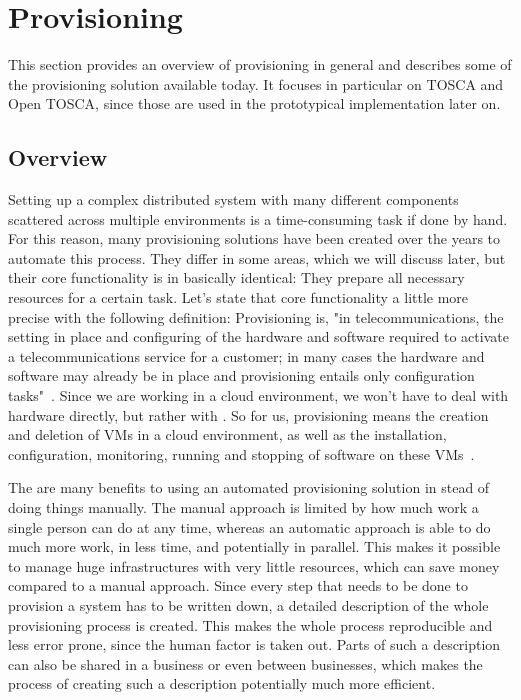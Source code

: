 \section{Provisioning}

This section provides an overview of provisioning in general and describes some of the provisioning solution available today.
It focuses in particular on TOSCA and Open TOSCA, since those are used in the prototypical implementation later on.

\subsection{Overview}

Setting up a complex distributed system with many different components scattered across multiple environments is a time-consuming task if done by hand.
For this reason, many provisioning solutions have been created over the years to automate this process.
They differ in some areas, which we will discuss later, but their core functionality is in basically identical: They prepare all necessary resources for a certain task.
Let's state that core functionality a little more precise with the following definition: Provisioning is, "in telecommunications, the setting in place and configuring of the hardware and software required to activate a telecommunications service for a customer; in many cases the hardware and software may already be in place and provisioning entails only configuration tasks"~\autocite{def:provisioning}.
Since we are working in a cloud environment, we won't have to deal with hardware directly, but rather with .
So for us, provisioning means the creation and deletion of VMs in a cloud environment, as well as the installation, configuration, monitoring, running and stopping of software on these VMs~\autocite{towardsprovisioning}.

The are many benefits to using an automated provisioning solution in stead of doing things manually.
The manual approach is limited by how much work a single person can do at any time, whereas an automatic approach is able to do much more work, in less time, and potentially in parallel.
This makes it possible to manage huge infrastructures with very little resources, which can save money compared to a manual approach.
Since every step that needs to be done to provision a system has to be written down, a detailed description of the whole provisioning process is created.
This makes the whole process reproducible and less error prone, since the human factor is taken out.
Parts of such a description can also be shared in a business or even between businesses, which makes the process of creating such a description potentially much more efficient.

